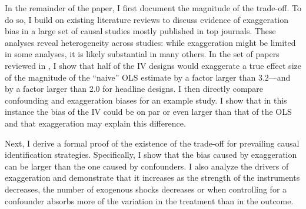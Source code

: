 			In the remainder of the paper, I first document the magnitude of the trade-off. To do so, I build on existing literature reviews \citep{brodeur_methods_2020, young_consistency_2022, bagilet_accurate_2023, lalHow2024} to discuss evidence of exaggeration bias in a large set of causal studies mostly published in top journals. %
			These analyses reveal heterogeneity across studies: while exaggeration might be limited in some analyses, it is likely substantial in many others. 
			In the set of papers reviewed in \cite{young_consistency_2022}, I show that 
			half of the IV designs would exaggerate a true effect size of the magnitude of the ``naive'' OLS estimate by a factor larger than 3.2---and by a factor larger than 2.0 for headline designs. %
			I then directly compare confounding and exaggeration biases for an example study. I show that in this instance the bias of the IV could be on par or even larger than that of the OLS and that exaggeration may explain this difference. 
			
			Next, I derive a formal proof of the existence of the trade-off for prevailing causal identification strategies. Specifically, I show that the bias caused by exaggeration can be larger than the one caused by confounders. I also analyze the drivers of exaggeration and demonstrate that it increases as the strength of the instruments decreases, the number of exogenous shocks decreases or when controlling for a confounder absorbs more of the variation in the treatment than in the outcome. 
			
